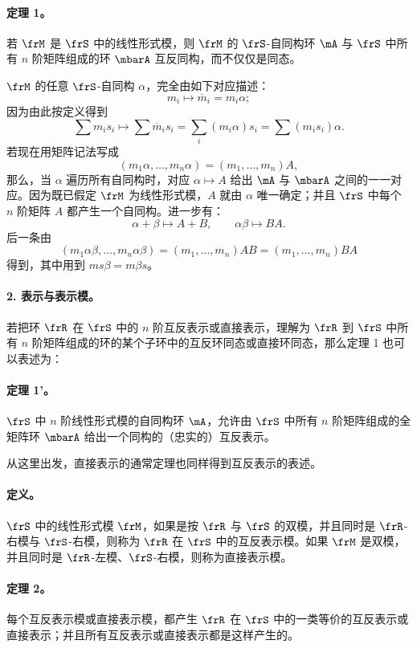 \paragraph{定理 1。}
若 \(\frM\) 是 \(\frS\) 中的线性形式模，则 \(\frM\) 的 \(\frS\)-自同构环 \(\mA\) 与 \(\frS\) 中所有 \(n\) 阶矩阵组成的环 \(\mbarA\) 互反同构，而不仅仅是同态。

\(\frM\) 的任意 \(\frS\)-自同构 \(\alpha\)，完全由如下对应描述：
\[
        m_i\longmapsto \overline m_i=m_i\alpha;
\]
因为由此按定义得到
\[
        \sum m_i s_i\longmapsto
        \sum \overline m_i s_i
        =\sum_i (m_i\alpha)s_i
        =\sum (m_i s_i)\alpha.
\]
若现在用矩阵记法写成
\[
        (m_1\alpha,\ldots,m_n\alpha)=(m_1,\ldots,m_n)A,
\]
那么，当 \(\alpha\) 遍历所有自同构时，对应 \(\alpha\mapsto A\) 给出 \(\mA\) 与 \(\mbarA\) 之间的一一对应。因为既已假定 \(\frM\) 为线性形式模，\(A\) 就由 \(\alpha\) 唯一确定；并且 \(\frS\) 中每个 \(n\) 阶矩阵 \(A\) 都产生一个自同构。进一步有：
\[
        \alpha+\beta\mapsto A+B,\qquad
        \alpha\beta\mapsto BA.
\]
后一条由
\[
        (m_1\alpha\beta,\ldots,m_n\alpha\beta)
        =(m_1,\ldots,m_n)AB
        =(m_1,\ldots,m_n)BA
\]
得到，其中用到 \(ms\beta=m\beta s\)。

\paragraph{2. 表示与表示模。}
若把环 \(\frR\) 在 \(\frS\) 中的 \(n\) 阶互反表示或直接表示，理解为 \(\frR\) 到 \(\frS\) 中所有 \(n\) 阶矩阵组成的环的某个子环中的互反环同态或直接环同态，那么定理 1 也可以表述为：

\paragraph{定理 1'。}
\(\frS\) 中 \(n\) 阶线性形式模的自同构环 \(\mA\)，允许由 \(\frS\) 中所有 \(n\) 阶矩阵组成的全矩阵环 \(\mbarA\) 给出一个同构的（忠实的）互反表示。

从这里出发，直接表示的通常定理也同样得到互反表示的表述。

\paragraph{定义。}
\(\frS\) 中的线性形式模 \(\frM\)，如果是按 \(\frR\) 与 \(\frS\) 的双模，并且同时是 \(\frR\)-右模与 \(\frS\)-右模，则称为 \(\frR\) 在 \(\frS\) 中的互反表示模。如果 \(\frM\) 是双模，并且同时是 \(\frR\)-左模、\(\frS\)-右模，则称为直接表示模。

\paragraph{定理 2。}
每个互反表示模或直接表示模，都产生 \(\frR\) 在 \(\frS\) 中的一类等价的互反表示或直接表示；并且所有互反表示或直接表示都是这样产生的。

